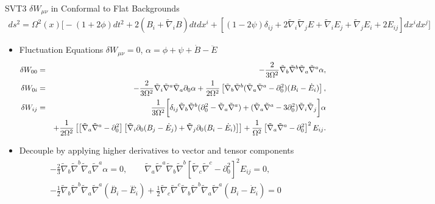 \documentclass[8pt,aspectratio=1610]{beamer}
\begin{document}

\begin{frame}{SVT3 $\delta W_{\mu\nu}$ in Conformal to Flat Backgrounds}
	\begin{eqnarray}
	ds^2 = \Omega^2(x)\bigg[-(1+2\phi)dt^2 + 2(B_i + \tilde\nabla_i B)dt dx^i 
	+ [(1-2\psi)\delta_{ij} + 2\tilde\nabla_i \tilde\nabla_j E + \tilde\nabla_i E_j + \tilde\nabla_j E_i + 2E_{ij}]dx^i dx^j\bigg]
	\end{eqnarray}
	\begin{itemize}
		\item Fluctuation Equations $\delta W_{\mu\nu} = 0$, $\alpha=\phi + \psi +\dot{B}-\ddot{E}$
		\begin{eqnarray}
		\delta W_{00}  &=& -\frac{2}{3\Omega^2} \tilde{\nabla}_{b}\tilde{\nabla}^{b}\tilde{\nabla}_{a}\tilde{\nabla}^{a}\alpha,
		\nonumber\\	
		\delta W_{0i} &=&  -\frac{2}{3\Omega^2} \tilde{\nabla}_i\tilde{\nabla}^a\tilde{\nabla}_a\partial_0\alpha
		+\frac{1}{2\Omega^2}\left[\tilde{\nabla}_{b}\tilde{\nabla}^b(\tilde{\nabla}_a\tilde{\nabla}^a-\partial_0^2)(B_i - \dot{E}_i)\right],
		\nonumber\\	
		\delta W_{ij}  &=& \frac{1}{3\Omega^2}\bigg{[} \delta_{ij}\tilde{\nabla}_{b}\tilde{\nabla}^b (\partial_0^2 - \tilde{\nabla}_a\tilde{\nabla}^a) 
		+(\tilde{\nabla}_{a}\tilde{\nabla}^a -3\partial_0^2)\tilde{\nabla}_i\tilde{\nabla}_j  
		\bigg{] }\alpha
		\\
		&&+\frac{1}{2\Omega^2}\left[ \left[\tilde{\nabla}_{a}\tilde{\nabla}^a -\partial_0^2\right]\left[\tilde{\nabla}_i   \partial_0(B_j - \dot{E}_j)+ \tilde{\nabla}_j \partial_0(B_i - \dot{E}_i)\right] \right]
		+\frac{1}{\Omega^2}\left[\tilde{\nabla}_a\tilde{\nabla}^a-\partial_0^2\right]^2E_{ij}.
		\nonumber
		\end{eqnarray}
		\item Decouple by applying higher derivatives to vector and tensor components
		\begin{eqnarray}
		- \tfrac{2}{3} \tilde{\nabla}_{b}\tilde{\nabla}^{b}\tilde{\nabla}_{a}\tilde{\nabla}^{a}\alpha=0,
		\qquad
		\tilde\nabla_a \tilde\nabla^a \tilde\nabla_b \tilde\nabla^b\left[\tilde\nabla_c \tilde\nabla^c - \partial_0^2\right]^2E_{ij}=0,
		\nonumber\\
		- \tfrac{1}{2} \tilde{\nabla}_{b}\tilde{\nabla}^{b}\tilde{\nabla}_{a}\tilde{\nabla}^{a}(\overset{..}{B}_{i}-\overset{...}{E}_{i}) + \tfrac{1}{2} \tilde{\nabla}_{c}\tilde{\nabla}^{c}\tilde{\nabla}_{b}\tilde{\nabla}^{b}\tilde{\nabla}_{a}\tilde{\nabla}^{a}(B_{i} -\dot{E}_{i})=0
		\end{eqnarray}
	\end{itemize}
\end{frame}
\end{document}

